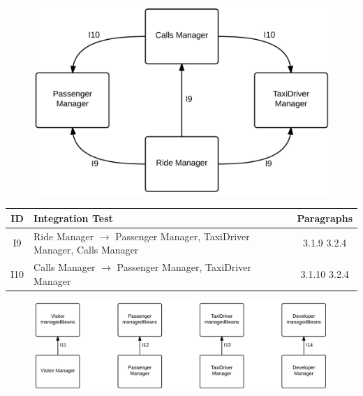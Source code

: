\begin{figure}[!htbp]
\centering
\includegraphics[width=\textwidth]{cpt/img/ITDPComponentDiagramsTP4}
\end{figure}

\begin{table}[!htbp]
\begin{center}
\begin{tabular}[t]{c|p{}|c}

\textbf{ID} & \textbf{Integration Test} & \textbf{Paragraphs} \\
\hline
I9 &  Ride Manager $\rightarrow$ Passenger Manager, TaxiDriver Manager, Calls Manager & 3.1.9  3.2.4\\
\hline
I10 & Calls Manager $\rightarrow$ Passenger Manager, TaxiDriver Manager & 3.1.10  3.2.4\\
\hline
\end{tabular}
\end{center}
\end{table}
\clearpage

\begin{figure}[!htbp]
\centering
\includegraphics[width=\textwidth]{cpt/img/ITDPComponentDiagramsTP5}
\end{figure}

